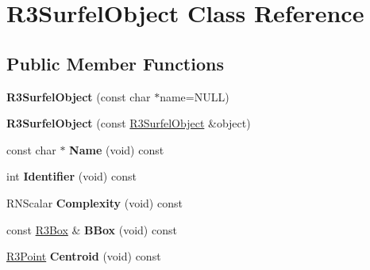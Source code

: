 \hypertarget{class_r3_surfel_object}{}\section{R3\+Surfel\+Object Class Reference}
\label{class_r3_surfel_object}
\subsection*{Public Member Functions}
\begin{DoxyCompactItemize}
\item 
{\bfseries R3\+Surfel\+Object} (const char $\ast$name=N\+U\+LL)\hypertarget{class_r3_surfel_object_adcd52da462d6b442b8dca1fa8a1d2667}{}\label{class_r3_surfel_object_adcd52da462d6b442b8dca1fa8a1d2667}

\item 
{\bfseries R3\+Surfel\+Object} (const \hyperlink{class_r3_surfel_object}{R3\+Surfel\+Object} \&object)\hypertarget{class_r3_surfel_object_ae16a46e3eddae1b6b71ad9cadd265e61}{}\label{class_r3_surfel_object_ae16a46e3eddae1b6b71ad9cadd265e61}

\item 
const char $\ast$ {\bfseries Name} (void) const \hypertarget{class_r3_surfel_object_a68feb518d8cf1cb398023d57cce3d9dd}{}\label{class_r3_surfel_object_a68feb518d8cf1cb398023d57cce3d9dd}

\item 
int {\bfseries Identifier} (void) const \hypertarget{class_r3_surfel_object_aa9579bd1ecb5ff58747aa1c1f0bd3530}{}\label{class_r3_surfel_object_aa9579bd1ecb5ff58747aa1c1f0bd3530}

\item 
R\+N\+Scalar {\bfseries Complexity} (void) const \hypertarget{class_r3_surfel_object_a698d029785781012a6a6641dec93cb20}{}\label{class_r3_surfel_object_a698d029785781012a6a6641dec93cb20}

\item 
const \hyperlink{class_r3_box}{R3\+Box} \& {\bfseries B\+Box} (void) const \hypertarget{class_r3_surfel_object_a57fe35b1296943fb18d9826fb2f2e80a}{}\label{class_r3_surfel_object_a57fe35b1296943fb18d9826fb2f2e80a}

\item 
\hyperlink{class_r3_point}{R3\+Point} {\bfseries Centroid} (void) const \hypertarget{class_r3_surfel_object_a69a78e16937e3b634c827d18679a904b}{}\label{class_r3_surfel_object_a69a78e16937e3b634c827d18679a904b}


\end{DoxyCompactItemize}
